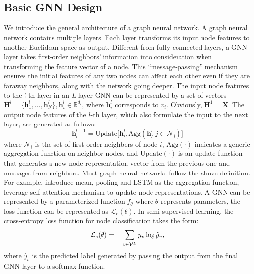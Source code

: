 \documentclass[sigconf]{acmart}
\def \V {\mathcal{V}}
\def \N {\mathcal{N}}
\def \L {\mathcal{L}}
\def \R {\mathbb{R}}
\def \X {\mathbf{X}}
\def \H {\mathbf{H}}
\def \h {\mathbf{h}}
\def \h {\mathbf{h}}
\begin{document}
\subsection{Basic GNN Design}
We introduce the general architecture of a graph neural network. A graph neural network contains multiple layers. Each layer transforms its input node features to another Euclidean space as output. Different from fully-connected layers, a GNN layer takes first-order neighbors' information into consideration when transforming the feature vector of a node. This ``message-passing'' mechanism ensures the initial features of any two nodes can affect each other even if they are faraway neighbors, along with the network going deeper.
The input node features to the $l$-th layer in an $L$-layer GNN can be represented by a set of vectors $\H^{l} = \{\h_1^{l}, \dots, \h_N^{l}\}, \h_i^{l} \in \R^{d_{l}}$, where $\h_i^l$ corresponds to $v_i$.
Obviously, $\H^1 = \X$.
The output node features of the $l$-th layer, which also formulate the input to the next layer, are generated as follows:
\begin{equation}
\label{eqn:general_layer}
    \h_i^{l+1} = \text{Update}\big [\h_i^{l}, \text{Agg}(\h_j^{l} | j\in\N_i)\big ]
\end{equation}
where $\N_i$ is the set of first-order neighbors of node $i$, $\text{Agg}(\cdot)$ indicates a generic aggregation function on neighbor nodes, and $\text{Update}(\cdot)$ is an update function that generates a new node representation vector from the previous one and messages from neighbors. Most graph neural networks follow the above definition. For example, \citeauthor{hamilton2017inductive} \cite{hamilton2017inductive} introduce mean, pooling and LSTM as the aggregation function, \citeauthor{velivckovic2017graph} \cite{velivckovic2017graph} leverage self-attention mechanism to update node representations.
A GNN can be represented by a parameterized function $f_\theta$ where $\theta$ represents parameters, the loss function can be represented as $\L_c(\theta)$.
In semi-supervised learning, the cross-entropy loss function for node classification takes the form:
\begin{equation}
\small\label{eqn:loss}
    \L_c(\theta) = -\sum_{v \in \V^L} y_v\log \hat{y}_v,
\end{equation}
where $\hat{y}_v$ is the predicted label generated by passing the output from the final GNN layer to a softmax function. 
\end{document}
